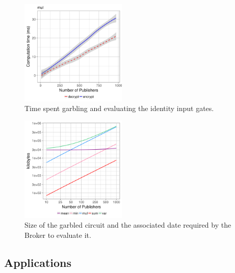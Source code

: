 \begin{figure}
  \includegraphics[width=0.45\textwidth]{plots/enc_dec_inputs.png}
  \caption{Time spent garbling and evaluating the identity input gates.}
\end{figure}



\begin{figure}
  \includegraphics[width=0.45\textwidth]{plots/size_log.png}
  \caption{Size of the garbled circuit and the associated date required by the
  Broker to evaluate it.}
\end{figure}

\subsection{Applications}

